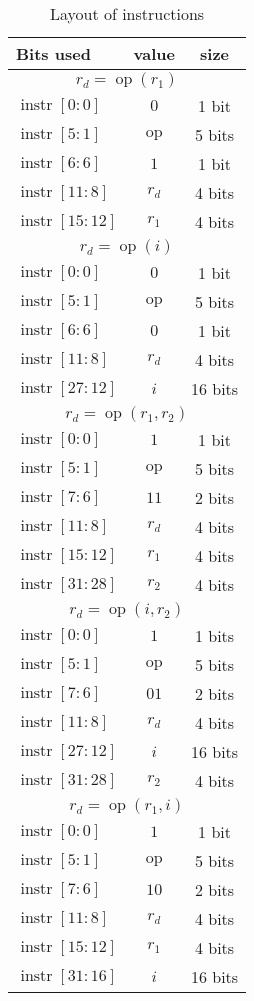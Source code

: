 \documentclass{scrartcl}
\DeclareMathOperator{\op}{op}
\DeclareMathOperator{\instr}{instr}
\begin{document}
\begin{table}
  \center
  \label{tab:instrs}
  \caption{Layout of instructions}
  \begin{tabular}{lcc}
    \toprule
    \textbf{Bits used} & \textbf{value} & \textbf{size}\\
    \midrule
    \multicolumn{3}{c}{\(r_d = \op(r_1)\)}\\
    \(\instr[0:0]\) & \(0\) & 1 bit\\
    \(\instr[5:1]\) & \(\op\) & 5 bits\\
    \(\instr[6:6]\) & \(1\) & 1 bit\\
    \(\instr[11:8]\) & \(r_d\) & 4 bits\\
    \(\instr[15:12]\) & \(r_1\) & 4 bits\\
    \midrule
    \multicolumn{3}{c}{\(r_d = \op(i)\)}\\
    \(\instr[0:0]\) & \(0\) & 1 bit\\
    \(\instr[5:1]\) & \(\op\) & 5 bits\\
    \(\instr[6:6]\) & \(0\) & 1 bit\\
    \(\instr[11:8]\) & \(r_d\) & 4 bits\\
    \(\instr[27:12]\) & \(i\) & 16 bits\\
    \midrule
    \multicolumn{3}{c}{\(r_d = \op(r_1, r_2)\)}\\
    \(\instr[0:0]\) & \(1\) & 1 bit\\
    \(\instr[5:1]\) & \(\op\) & 5 bits\\
    \(\instr[7:6]\) & \(11\) & 2 bits\\
    \(\instr[11:8]\) & \(r_d\) & 4 bits\\
    \(\instr[15:12]\) & \(r_1\) & 4 bits\\
    \(\instr[31:28]\) & \(r_2\) & 4 bits\\
    \midrule
    \multicolumn{3}{c}{\(r_d = \op(i, r_2)\)}\\
    \(\instr[0:0]\) & \(1\) & 1 bits\\
    \(\instr[5:1]\) & \(\op\) & 5 bits\\
    \(\instr[7:6]\) & \(01\) & 2 bits\\
    \(\instr[11:8]\) & \(r_d\) & 4 bits\\
    \(\instr[27:12]\) & \(i\) & 16 bits\\
    \(\instr[31:28]\) & \(r_2\) & 4 bits\\
    \midrule
    \multicolumn{3}{c}{\(r_d = \op(r_1, i)\)}\\
    \(\instr[0:0]\) & \(1\) & 1 bit\\
    \(\instr[5:1]\) & \(\op\) & 5 bits\\
    \(\instr[7:6]\) & \(10\) & 2 bits\\
    \(\instr[11:8]\) & \(r_d\) & 4 bits\\
    \(\instr[15:12]\) & \(r_1\) & 4 bits\\
    \(\instr[31:16]\) & \(i\) & 16 bits\\
    \bottomrule
  \end{tabular}
\end{table}
\end{document}
